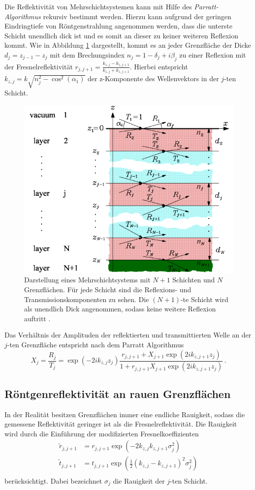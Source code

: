 Die Reflektivität von Mehrschichtsystemen kann mit Hilfe des \textit{Parratt-Algorithmus} rekursiv bestimmt werden.
Hierzu kann aufgrund der geringen Eindringtiefe von Röntgenstrahlung angenommen werden, dass die unterste Schicht unendlich dick ist und es somit an dieser zu keiner weiteren Reflexion kommt.
Wie in Abbildung \ref{fig:tfig4} dargestellt, kommt es an jeder Grenzfläche der Dicke $d_j = z_{j-1}-z_j$ mit dem Brechungsindex $n_j=1-\delta_j+i\beta_j$ zu einer Reflexion mit der Fresnelreflektivität $r_{j, j+1}=\frac{k_{z,j}-k_{z,j+1}}{k_{z,j}+k_{z,j+1}}$.
Hierbei entspricht $k_{z,j}= k\sqrt{n_j^2-\cos^2(\alpha_1)}$ der z-Komponente des Wellenvektors in der $j$-ten Schicht.
\begin{figure}[H]
\centering
\includegraphics[width=0.7\linewidth]{figures/Parratt}
\caption{Darstellung eines Mehrschichtsystems mit $N+1$ Schichten und $N$ Grenzflächen.
Für jede Schicht sind die Reflexions- und Transmissionskomponenten zu sehen.
Die $(N+1)$-te Schicht wird als unendlich Dick angenommen, sodass keine weitere Reflexion auftritt \cite{skript}.}
\label{fig:tfig4}
\end{figure}
Das Verhältnis der Amplituden der reflektierten und transmittierten Welle an der $j$-ten Grenzfläche entspricht nach dem Parratt Algorithmus
\begin{equation}
    X_j = \frac{R_j}{T_j}=\exp(-2ik_{z,j}z_j)\frac{r_{j, j+1}+X_{j+1}\exp(2ik_{z,j+1}z_j)}{1+r_{j,j+1}X_{j+1}\exp(2ik_{z,j+1}z_j)}\, .
\end{equation}

\subsection*{Röntgenreflektivität an rauen Grenzflächen}
In der Realität besitzen Grenzflächen immer eine endliche Rauigkeit, sodass die gemessene Reflektivität geringer ist als die Fresnelreflektivität.
Die Rauigkeit wird durch die Einführung der modifizierten Fresnelkoeffizienten
\begin{align}
    \tilde{r}_{j, j+1} &= r_{j,j+1}\exp\left(-2k_{z,j}k_{z,j+1}\sigma_j^2\right)\\
    \tilde{t}_{j, j+1} &= t_{j,j+1}\exp\left(\frac{1}{2}(k_{z,j}-k_{z,j+1})^2\sigma_j^2\right )\\
\end{align}
berücksichtigt. Dabei bezeichnet $\sigma_j$ die Rauigkeit der $j$-ten Schicht.

